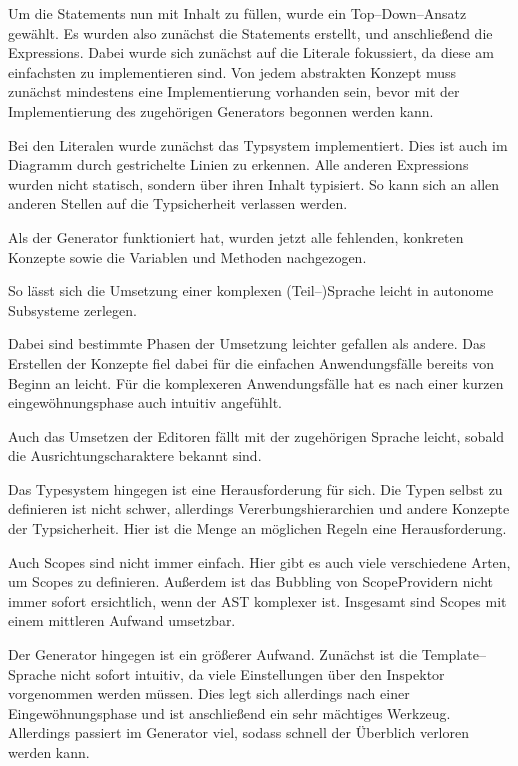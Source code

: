 Um die Statements nun mit Inhalt zu füllen, wurde ein Top--Down--Ansatz gewählt.
Es wurden also zunächst die Statements erstellt, und anschließend die Expressions.
Dabei wurde sich zunächst auf die Literale fokussiert, da diese am einfachsten zu implementieren sind.
Von jedem abstrakten Konzept muss zunächst mindestens eine Implementierung vorhanden sein, bevor mit der Implementierung des zugehörigen Generators begonnen werden kann.

Bei den Literalen wurde zunächst das Typsystem implementiert.
Dies ist auch im Diagramm durch gestrichelte Linien zu erkennen.
Alle anderen Expressions wurden nicht statisch, sondern über ihren Inhalt typisiert.
So kann sich an allen anderen Stellen auf die Typsicherheit verlassen werden.

Als der Generator funktioniert hat, wurden jetzt alle fehlenden, konkreten Konzepte sowie die Variablen und Methoden nachgezogen.

So lässt sich die Umsetzung einer komplexen (Teil--)Sprache leicht in autonome Subsysteme zerlegen.

Dabei sind bestimmte Phasen der Umsetzung leichter gefallen als andere.
Das Erstellen der Konzepte fiel dabei für die einfachen Anwendungsfälle bereits von Beginn an leicht.
Für die komplexeren Anwendungsfälle hat es nach einer kurzen eingewöhnungsphase auch intuitiv angefühlt.

Auch das Umsetzen der Editoren fällt mit der zugehörigen Sprache leicht, sobald die Ausrichtungscharaktere bekannt sind.

Das Typesystem hingegen ist eine Herausforderung für sich.
Die Typen selbst zu definieren ist nicht schwer, allerdings Vererbungshierarchien und andere Konzepte der Typsicherheit.
Hier ist die Menge an möglichen Regeln eine Herausforderung.

Auch Scopes sind nicht immer einfach.
Hier gibt es auch viele verschiedene Arten, um Scopes zu definieren.
Außerdem ist das Bubbling von {\ttfamily ScopeProvider}n nicht immer sofort ersichtlich, wenn der \ac{AST} komplexer ist.
Insgesamt sind Scopes mit einem mittleren Aufwand umsetzbar.

Der Generator hingegen ist ein größerer Aufwand.
Zunächst ist die Template--Sprache nicht sofort intuitiv, da viele Einstellungen über den Inspektor vorgenommen werden müssen.
Dies legt sich allerdings nach einer Eingewöhnungsphase und ist anschließend ein sehr mächtiges Werkzeug.
Allerdings passiert im Generator viel, sodass schnell der Überblich verloren werden kann.

